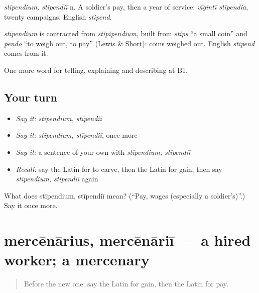 \emph{stīpendium, stīpendiī} n. A soldier's pay, then a year of service: \emph{vīgintī stīpendia}, twenty campaigns. English \emph{stipend}.

\begin{cousinweb}
\emph{stīpendium} is contracted from \emph{stipipendium}, built from \emph{stips} \textquotedblleft{}a small coin\textquotedblright{} and \emph{pendō} \textquotedblleft{}to weigh out, to pay\textquotedblright{} (Lewis \& Short): coins weighed out. English \emph{stipend} comes from it.
\end{cousinweb}

\begin{grammarlens}[title={What you've built}]
One more word for telling, explaining and describing at B1.
\end{grammarlens}

\subsection*{Your turn}
\begin{itemize}
\raggedright
  \item \emph{Say it:} \emph{stīpendium, stīpendiī}
  \item \emph{Say it:} \emph{stīpendium, stīpendiī}, once more
  \item \emph{Say it:} a sentence of your own with \emph{stīpendium, stīpendiī}
  \item \emph{Recall:} say the Latin for to carve, then the Latin for gain, then say \emph{stīpendium, stīpendiī} again
\end{itemize}

\begin{tcolorbox}[breakable,colback=teal!4,colframe=teal!35!black,title={Before you move on}]
What does stīpendium, stīpendiī mean? (\textquotedblleft{}Pay, wages (especially a soldier's)\textquotedblright{}.) Say it once more.
\end{tcolorbox}
\section[mercēnārius, mercēnāriī]{mercēnārius, mercēnāriī — a hired worker; a mercenary}

\label{lesson:LA-C379-mercenarius}



\begin{quote}
Before the new one: say the Latin for gain, then the Latin for pay.
\end{quote}

